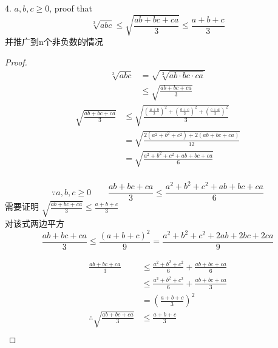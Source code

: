 \documentclass[10pt,a4paper]{book}
\begin{document}
	
	4. $ a,b,c \ge 0 $, proof that
	\begin{equation}
		\sqrt[3]{abc}\le \sqrt{\frac{ab+bc+ca}{3}}\le\frac{a+b+c}{3}
	\end{equation}
	并推广到n个非负数的情况
	\begin{proof}
		\\
		\begin{equation}
			\begin{aligned}
				\sqrt[3]{abc} &=\sqrt{\sqrt[3]{ab\cdot bc\cdot ca}}\\
				&\le \sqrt{\frac{ab+bc+ca}{3}}
			\end{aligned}
		\end{equation}
		\begin{equation}
			\begin{aligned}
				\sqrt{\frac{ab+bc+ca}{3}} &\le \sqrt{\frac{
						(\frac{a+b}{2})^2+
						(\frac{b+c}{2})^2+
						(\frac{c+a}{2})^2
					}{3}}\\
				&=\sqrt{\frac{2(a^2+b^2+c^2)+2(ab+bc+ca)}{12}}\\
				&=\sqrt{\frac{a^2+b^2+c^2+ab+bc+ca}{6}}\\				
			\end{aligned}
		\end{equation}
	
	\begin{equation*}
		\because a,b,c \ge 0 \qquad 	\frac{ab+bc+ca}{3} \le \frac{a^2+b^2+c^2+ab+bc+ca}{6}
	\end{equation*}
	需要证明 $ \sqrt{\frac{ab+bc+ca}{3}}\le\frac{a+b+c}{3} $\\
	对该式两边平方
	\begin{equation}
		{\frac{ab+bc+ca}{3}}\le\frac{(a+b+c)^2}{9} = \frac{a^2+b^2+c^2 + 2ab+2bc+2ca}{9}
	\end{equation}
	
	\begin{equation}
		\begin{aligned}
			\frac{ab+bc+ca}{3}  &\le \frac{a^2+b^2+c^2}{6} + \frac{ab+bc+ca}{6}\\
								&\le \frac{a^2+b^2+c^2}{6} + \frac{ab+bc+ca}{3}\\
								&= (\frac{a+b+c}{3})^2 \\
			\therefore 	\sqrt{\frac{ab+bc+ca}{3}}  &\le  \frac{a+b+c}{3}\\
		\end{aligned}
	\end{equation}

	\end{proof}
	
\end{document}
